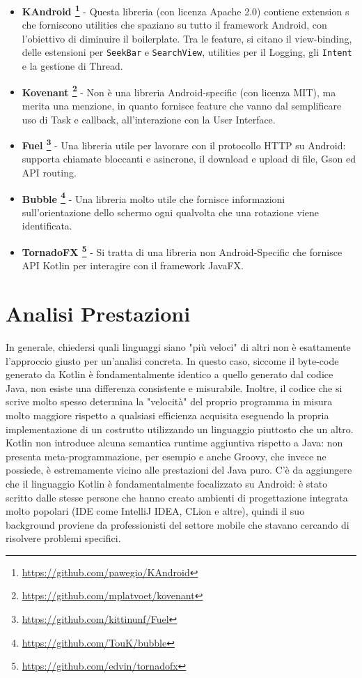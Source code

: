 \begin{itemize}
  \item {\bfseries KAndroid \footnote{\url{https://github.com/pawegio/KAndroid}}} - Questa libreria (con licenza Apache 2.0) contiene extension s che forniscono utilities che spaziano su tutto il framework Android, con l'obiettivo di diminuire il boilerplate. Tra le feature, si citano il view-binding, delle estensioni per \texttt{SeekBar} e \texttt{SearchView}, utilities per il Logging, gli \texttt{Intent} e la gestione di Thread.
  \item {\bfseries Kovenant \footnote{\url{https://github.com/mplatvoet/kovenant}}} - Non è una libreria Android-specific (con licenza MIT), ma merita una menzione, in quanto fornisce feature che vanno dal semplificare uso di Task e callback, all'interazione con la User Interface.
  \item {\bfseries Fuel \footnote{\url{https://github.com/kittinunf/Fuel}}} - Una libreria utile per lavorare con il protocollo HTTP su Android: supporta chiamate bloccanti e asincrone, il download e upload di file, Gson ed API routing.
  \item {\bfseries Bubble \footnote{\url{https://github.com/TouK/bubble}}} - Una libreria molto utile che fornisce informazioni sull'orientazione dello schermo ogni qualvolta che una rotazione viene identificata.
  \item {\bfseries TornadoFX \footnote{\url{https://github.com/edvin/tornadofx}}} - Si tratta di una libreria non Android-Specific che fornisce API Kotlin per interagire con il framework JavaFX.\\
\end{itemize}

\section{Analisi Prestazioni}
In generale, chiedersi quali linguaggi siano "più veloci" di altri non è esattamente l'approccio giusto per un'analisi concreta. In questo caso, siccome il byte-code generato da Kotlin è fondamentalmente identico a quello generato dal codice Java, non esiste una differenza consistente e misurabile. Inoltre, il codice che si scrive molto spesso determina la "velocità" del proprio programma in misura molto maggiore rispetto a qualsiasi efficienza acquisita eseguendo la propria implementazione di un costrutto utilizzando un linguaggio piuttosto che un altro.\\
Kotlin non introduce alcuna semantica runtime aggiuntiva rispetto a Java: non presenta meta-programmazione, per esempio e anche Groovy, che invece ne possiede, è estremamente vicino alle prestazioni del Java puro.
C’è da aggiungere che il linguaggio Kotlin è fondamentalmente focalizzato su Android: è stato scritto dalle stesse persone che hanno creato ambienti di progettazione integrata molto popolari (IDE come IntelliJ IDEA, CLion e altre), quindi il suo background proviene da professionisti del settore mobile che stavano cercando di risolvere problemi specifici.\\

